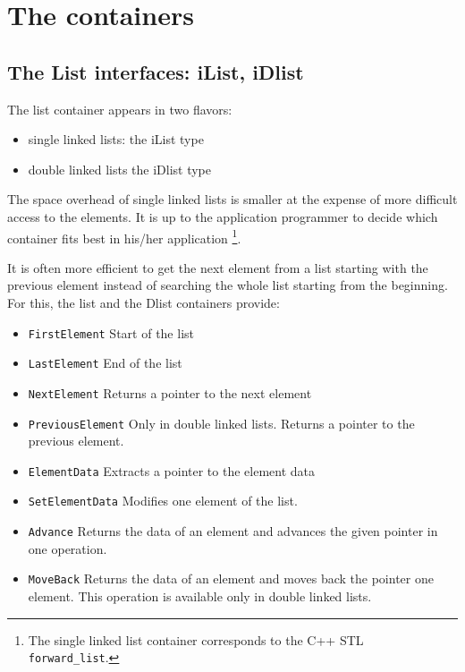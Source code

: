 \documentclass[12pt,a4paper]{memoir} %
\newif\iftth
\newenvironment{ShorterItemize}{
\begin{itemize}
\iftth\else
  \setlength{\itemsep}{1pt}
  \setlength{\parskip}{0pt}
  \setlength{\parsep}{0pt}
\fi
}{\end{itemize}
}
\newcommand{\container}{}
\begin{document}
\chapter{The containers}
\renewcommand{\container}{List}
\section{The List interfaces: iList, iDlist}
The list container appears in two flavors: 
\begin{itemize}
\item
single linked lists: the iList type
\item
double linked lists the iDlist type
\end{itemize}
The space overhead of single linked lists is smaller at the expense of more difficult access to the elements. It is up to the application programmer to decide which container fits best in his/her application
\footnote{
The single linked list container corresponds to the C++ STL \texttt{forward\_list}.
}.

It is often more efficient to get the next element from a list starting with the previous element instead of searching the whole list starting from the beginning. For this, the list and the Dlist containers provide:
\begin{ShorterItemize}
\item \verb,FirstElement, Start of the list
\item \verb,LastElement, End of the list
\item \verb,NextElement, Returns a pointer to the next element
\item \verb,PreviousElement, Only in double linked lists. Returns a pointer to the previous element.
\item \verb,ElementData, Extracts a pointer to the element data 
\item \verb,SetElementData, Modifies one element of the list.
\item \verb,Advance, Returns the data of an element and advances the given pointer in one operation.
\item \verb,MoveBack, Returns the data of an element and moves back the pointer one element. This operation is available only in double linked lists.
\end{ShorterItemize}
\end{document}
